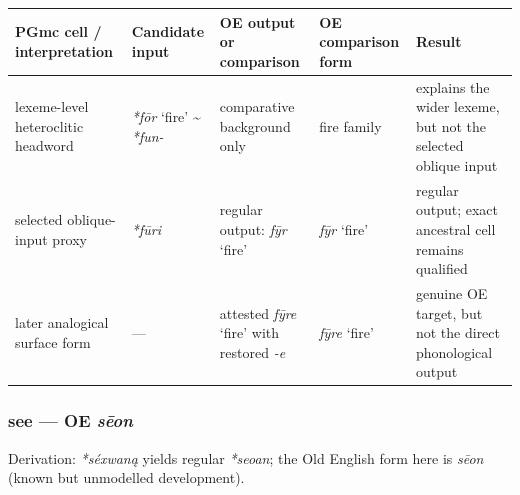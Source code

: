 \documentclass[
  british,
  a4paper,
]{article}
\newcounter{none} %
\providecommand{\Recon}[1]{\emph{*#1}}
\begin{document}
{\def\LTcaptype{none} %
\begin{longtable}[]{@{}
  >{\raggedright\arraybackslash}p{}
  >{\raggedright\arraybackslash}p{}
  >{\raggedright\arraybackslash}p{}
  >{\raggedright\arraybackslash}p{}
  >{\raggedright\arraybackslash}p{}@{}}
\toprule\noalign{}
\begin{minipage}[b]{\linewidth}\raggedright
PGmc cell / interpretation
\end{minipage} & \begin{minipage}[b]{\linewidth}\raggedright
Candidate input
\end{minipage} & \begin{minipage}[b]{\linewidth}\raggedright
OE output or comparison
\end{minipage} & \begin{minipage}[b]{\linewidth}\raggedright
OE comparison form
\end{minipage} & \begin{minipage}[b]{\linewidth}\raggedright
Result
\end{minipage} \\
\midrule\noalign{}
\endhead
\bottomrule\noalign{}
\endlastfoot
lexeme-level heteroclitic headword & \Recon{fōr} `fire'
\textasciitilde{} \emph{*fun-} & comparative background only & fire
family & explains the wider lexeme, but not the selected oblique
input \\
selected oblique-input proxy & {\emph{*fūri}} & regular output:
{\emph{fȳr}} `fire' & {\emph{fȳr}} `fire' & regular output; exact
ancestral cell remains qualified \\
later analogical surface form & --- & attested {\emph{fȳre}} `fire' with
restored \emph{-e} & {\emph{fȳre}} `fire' & genuine OE target, but not
the direct phonological output \\
\end{longtable}
}

\subsubsection{\texorpdfstring{see --- OE
\emph{sēon}}{see --- OE sēon}}\label{see-oe-sux113on}

Derivation: \emph{*séxwaną} yields regular \Recon{seoan}; the Old
English form here is \emph{sēon} (known but unmodelled development).
\end{document}
